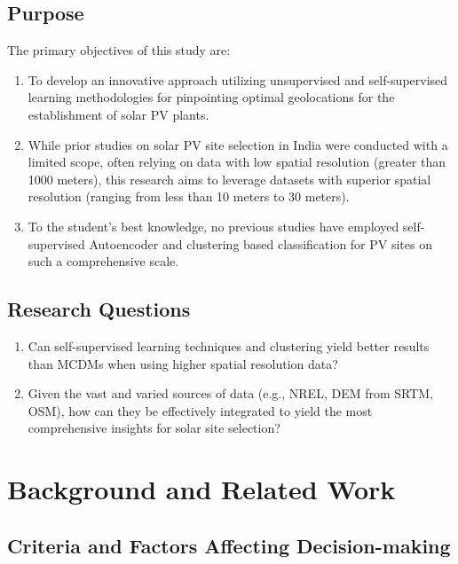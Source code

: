 \documentclass[a4paper,12pt]{Classes/RoboticsLaTeX}
\begin{document}
	
	\section{Purpose}

	The primary objectives of this study are:

	\begin{enumerate}
		\item To develop an innovative approach utilizing unsupervised and self-supervised learning methodologies for pinpointing optimal geolocations for the establishment of solar PV plants.
		
		\item While prior studies on solar PV site selection in India were conducted with a limited scope, often relying on data with low spatial resolution (greater than 1000 meters), this research aims to leverage datasets with superior spatial resolution (ranging from less than 10 meters to 30 meters).
		
		\item To the student's best knowledge, no previous studies have employed self-supervised Autoencoder and clustering based classification for PV sites on such a comprehensive scale.
	\end{enumerate}

	\section{Research Questions}

	\begin{enumerate}
		\item Can self-supervised learning techniques and clustering yield better results than MCDMs when using higher spatial resolution data?
		\item Given the vast and varied sources of data (e.g., NREL, DEM from SRTM, OSM), how can they be effectively integrated to yield the most comprehensive insights for solar site selection?
	\end{enumerate}

	\chapter{Background and Related Work}
	
	\section{Criteria and Factors Affecting Decision-making}
\end{document}
